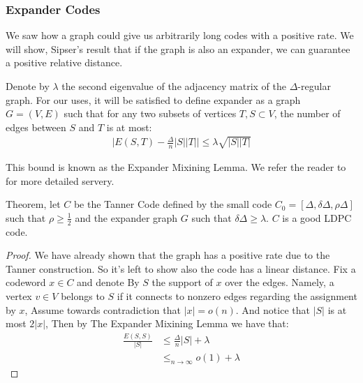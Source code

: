 \documentclass[manuscript,screen,review]{acmart}
\begin{document}
{  \subsubsection{Expander Codes}
  We saw how a graph could give us arbitrarily long codes with a positive rate. We will show, Sipser's result \cite{ExpanderCodes} that if the graph is also an expander, we can guarantee a positive relative distance. 
  \begin{definition} Denote by $\lambda$ the second eigenvalue of the adjacency matrix of the $\Delta$-regular graph. For our uses, it will be satisfied to define expander as a graph $G = \left( V,E \right)$ such that for any two subsets of vertices $T,S \subset V$, the number of edges between $S$ and $T$ is at most:
  \begin{equation*}
    \begin{split}
      \mid E\left( S,T \right) - \frac{\Delta}{n}|S||T| \mid \le \lambda\sqrt{|S| |T|} 
    \end{split}
  \end{equation*}
\end{definition}
This bound is known as the Expander Mixining Lemma. We refer the reader to \cite{hoory2006expander} for more detailed servery. 
  \begin{theorem*} Theorem, let $C$ be the Tanner Code defined by the small code $C_{0} = [\Delta,\delta\Delta, \rho\Delta ]$ such that $\rho \ge \frac{1}{2}$ and the expander graph $G$ such that $\delta\Delta \ge \lambda$. $C$ is a good  LDPC code.
  \end{theorem*}
  \begin{proof} We have already shown that the graph has a positive rate due to the Tanner construction. So it's left to show also the code has a linear distance. Fix a codeword $x \in C$ and denote By $S$ the support of $x$ over the edges. Namely, a vertex $v\in V$ belongs to $S$ if it connects to nonzero edges regarding the assignment by $x$, Assume towards contradiction that $|x| = o\left( n \right)$. And notice that $|S|$ is at most $2|x|$, Then by The Expander Mixining Lemma we have that: 
  \begin{equation*}
    \begin{split}
      \frac{E\left( S,S \right)}{|S|} & \le \frac{\Delta}{n}|S|  + \lambda \\
      & \le_{ n \rightarrow \infty} o\left( 1 \right) + \lambda
    \end{split}
  \end{equation*}


\end{proof}}
\end{document}
